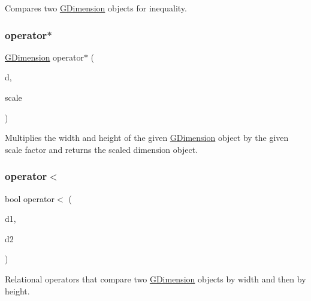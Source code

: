 Compares two \mbox{\hyperlink{structsgl_1_1GDimension}{G\+Dimension}} objects for inequality. 

\mbox{\label{structsgl_1_1GDimension_a84a7c3c5763523efef91d5b6398c730c}} 
\subsubsection{\texorpdfstring{operator$\ast$}{operator*}}
{\footnotesize\ttfamily \mbox{\hyperlink{structsgl_1_1GDimension}{G\+Dimension}} operator$\ast$ (\begin{DoxyParamCaption}\item[{const \mbox{\hyperlink{structsgl_1_1GDimension}{G\+Dimension}} \&}]{d,  }\item[{double}]{scale }\end{DoxyParamCaption})\hspace{0.3cm}{\ttfamily [friend]}}



Multiplies the width and height of the given \mbox{\hyperlink{structsgl_1_1GDimension}{G\+Dimension}} object by the given scale factor and returns the scaled dimension object. 

\mbox{\label{structsgl_1_1GDimension_abcbb6e3b6e238b5155c96d6340bf5f43}} 
\subsubsection{\texorpdfstring{operator$<$}{operator<}}
{\footnotesize\ttfamily bool operator$<$ (\begin{DoxyParamCaption}\item[{const \mbox{\hyperlink{structsgl_1_1GDimension}{G\+Dimension}} \&}]{d1,  }\item[{const \mbox{\hyperlink{structsgl_1_1GDimension}{G\+Dimension}} \&}]{d2 }\end{DoxyParamCaption})\hspace{0.3cm}{\ttfamily [friend]}}



Relational operators that compare two \mbox{\hyperlink{structsgl_1_1GDimension}{G\+Dimension}} objects by width and then by height. 

